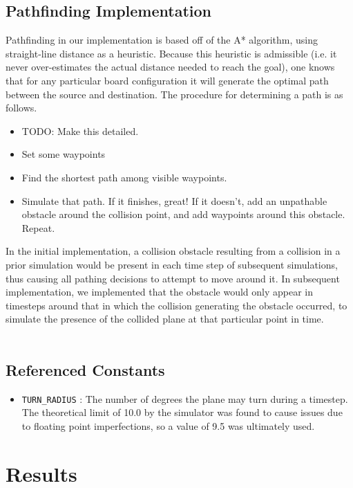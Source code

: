 \documentclass[10pt]{article}
\newcommand{\ms}[1] {
  \texttt{#1}
}
\begin{document}
\subsection{Pathfinding Implementation}
Pathfinding in our implementation is based off of the A* algorithm, using straight-line distance as a
heuristic. Because this heuristic is admissible (i.e. it never over-estimates the actual distance needed
to reach the goal), one knows that for any particular board configuration it will generate the optimal
path between the source and destination. The procedure for determining a path is as follows.
\begin{itemize}
  \item TODO: Make this detailed.
  \item Set some waypoints
  \item Find the shortest path among visible waypoints.
  \item Simulate that path. If it finishes, great! If it doesn't, add an unpathable obstacle around the 
    collision point, and add waypoints around this obstacle. Repeat.
\end{itemize}
In the initial implementation, a collision obstacle resulting from a collision in a prior simulation would
be present in each time step of subsequent simulations, thus causing all pathing decisions to attempt to
move around it. In subsequent implementation, we implemented that the obstacle would only appear in timesteps
around that in which the collision generating the obstacle occurred, to simulate the presence of the collided
plane at that particular point in time.\\\\

\subsection{Referenced Constants}
\begin{itemize}
  \item \ms{TURN\_RADIUS}: The number of degrees the plane may turn during a timestep. The theoretical limit of 
    10.0 by the simulator was found to cause issues due to floating point imperfections, so a value of 
    9.5 was ultimately used.
\end{itemize}


\newpage
\section{Results}
\end{document}
